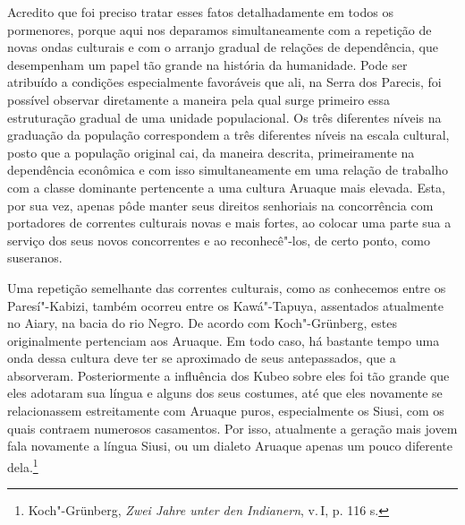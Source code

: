 Acredito que foi preciso tratar esses fatos detalhadamente em todos os
pormenores, porque aqui nos deparamos simultaneamente com a repetição
de novas ondas culturais e com o arranjo gradual de relações de
dependência, que desempenham um papel tão grande na história da
humanidade. Pode ser atribuído a condições especialmente favoráveis que
ali, na Serra dos Parecis, foi possível observar diretamente a maneira
pela qual surge primeiro essa estruturação gradual de uma unidade
populacional. Os três diferentes níveis na graduação da população
correspondem a três diferentes níveis na escala cultural, posto que a
população original cai, da maneira descrita, primeiramente na
dependência econômica e com isso simultaneamente em uma relação de
trabalho com a classe dominante pertencente a uma cultura Aruaque mais
elevada. Esta, por sua vez, apenas pôde manter seus direitos senhoriais
na concorrência com portadores de correntes culturais novas e mais
fortes, ao colocar uma parte sua a serviço dos seus novos concorrentes e
ao reconhecê"-los, de certo ponto, como suseranos.

Uma repetição semelhante das correntes culturais, como as conhecemos
entre os Paresí"-Kabizi, também ocorreu entre os Kawá"-Tapuya, assentados
atualmente no Aiary, na bacia do rio Negro. De acordo com Koch"-Grünberg,
estes originalmente pertenciam aos Aruaque. Em todo caso, há bastante
tempo uma onda dessa cultura deve ter se aproximado de seus
antepassados, que a absorveram. Posteriormente a influência dos Kubeo
sobre eles foi tão grande que eles adotaram sua língua e alguns dos seus
costumes, até que eles novamente se relacionassem estreitamente com
Aruaque puros, especialmente os Siusi, com os quais contraem numerosos
casamentos. Por isso, atualmente a geração mais jovem fala novamente a
língua Siusi, ou um dialeto Aruaque apenas um pouco diferente
dela.\footnote{Koch"-Grünberg, \emph{Zwei Jahre unter den Indianern}, v.\,\textsc{I}, p. 116 s.}

